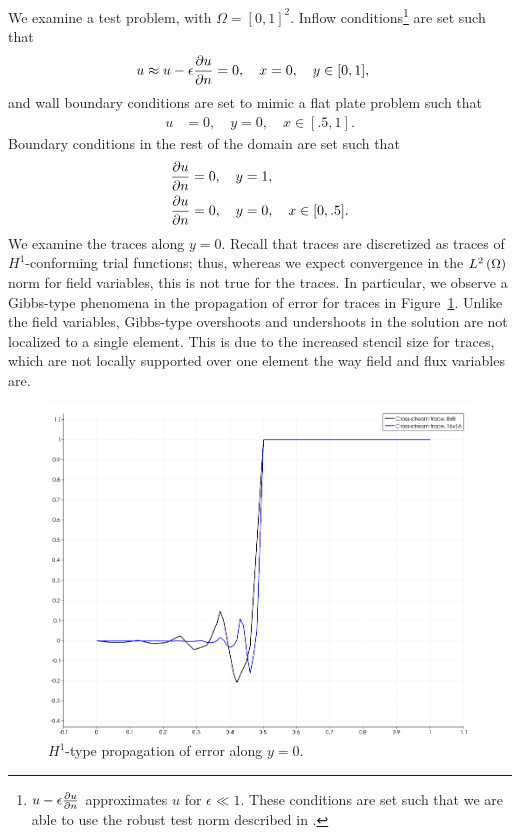 We examine a test problem, with $\Omega = [0,1]^2$.  Inflow conditions\footnote{$u-\epsilon\pd{u}{n}$ approximates $u$ for $\epsilon\ll 1$.  These conditions are set such that we are able to use the robust test norm described in \cite{DPGrobustness2}.} are set such that
\begin{align*}
u \approx u-\epsilon\pd{u}{n} &= 0,\quad x = 0,\quad y \in [0,1],
\end{align*}
and wall boundary conditions are set to mimic a flat plate problem such that
\begin{align*}
u &= 0,\quad y = 0,\quad x \in [.5,1].
\end{align*}
Boundary conditions in the rest of the domain are set such that
\begin{align*}
\pd{u}{n} &= 0,\quad y = 1,\\
\pd{u}{n} &= 0,\quad y = 0,\quad x \in [0,.5].
\end{align*}
We examine the traces along $y=0$.  Recall that traces are discretized as traces of $H^1$-conforming trial functions; thus, whereas we expect convergence in the $\L$ norm for field variables, this is not true for the traces.  In particular, we observe a Gibbs-type phenomena in the propagation of error for traces in Figure~\ref{fig:traceErrors}.  Unlike the field variables, Gibbs-type overshoots and undershoots in the solution are not localized to a single element.  This is due to the increased stencil size for traces, which are not locally supported over one element the way field and flux variables are.
\begin{figure}
\centering
\includegraphics[scale=.4]{figs/CrossTraces.png}
\caption{$H^1$-type propagation of error along $y = 0$.}
\label{fig:traceErrors}
\end{figure}

